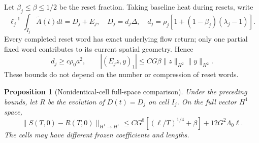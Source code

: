 \documentclass[11pt,a4paper]{amsart}
\newtheorem{proposition}[theorem]{Proposition}
\theoremstyle{definition}
\theoremstyle{remark}
\numberwithin{equation}{section}
\begin{document}
Let $\beta_j\le\beta\le1/2$ be the reset fraction. Taking baseline heat
during resets, write
\begin{equation}\label{par:cellaverage}
 \ell_j^{-1}\int_{I_j}\widetilde A(t)dt=D_j+E_j,
 \quad D_j=d_j\Delta,
 \quad d_j=\rho_j[1+(1-\beta_j)(\lambda_j-1)].
\end{equation}
Every completed reset word has exact underlying flow return; only one partial
fixed word contributes to its current spatial geometry. Hence
\begin{equation}\label{par:resetaverage}
 d_j\ge c\rho_0a^2,
 \qquad |(E_jz,y)_1|\le CG\beta\|z\|_{H^2}\|y\|_{H^2}.
\end{equation}
These bounds do not depend on the number or compression of reset words.

\begin{proposition}[Nonidentical-cell full-space comparison]
\label{par:averaging}
Under the preceding bounds, let $R$ be the evolution of $D(t)=D_j$ on cell
$I_j$. On the full vector $H^1$ space,
\begin{equation}\label{par:macrocomparison}
 \|S(T,0)-R(T,0)\|_{H^1\to H^1}
 \le CG^8[(\ell/T)^{1/4}+\beta]+12G^2\Lambda_0\ell.
\end{equation}
The cells may have different frozen coefficients and lengths.
\end{proposition}
\end{document}
